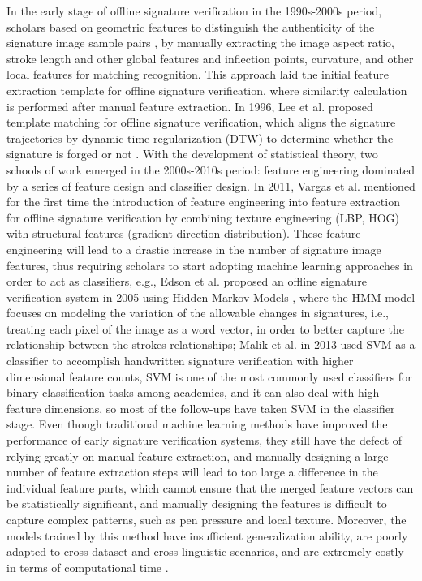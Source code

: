 In the early stage of offline signature verification in the 1990s-2000s period, scholars based on geometric features to distinguish the authenticity of the signature image sample pairs \cite{31}, by manually extracting the image aspect ratio, stroke length and other global features and inflection points, curvature, and other local features for matching recognition. This approach laid the initial feature extraction template for offline signature verification, where similarity calculation is performed after manual feature extraction. In 1996, Lee et al. proposed template matching for offline signature verification, which aligns the signature trajectories by dynamic time regularization (DTW) to determine whether the signature is forged or not \cite{20}. With the development of statistical theory, two schools of work emerged in the 2000s-2010s period: feature engineering dominated by a series of feature design and classifier design. In 2011, Vargas et al. mentioned for the first time the introduction of feature engineering into feature extraction for offline signature verification by combining texture engineering (LBP, HOG) with structural features (gradient direction distribution). These feature engineering will lead to a drastic increase in the number of signature image features, thus requiring scholars to start adopting machine learning approaches in order to act as classifiers, e.g., Edson et al. proposed an offline signature verification system in 2005 using Hidden Markov Models \cite{17}, where the HMM model focuses on modeling the variation of the allowable changes in signatures, i.e., treating each pixel of the image as a word vector, in order to better capture the relationship between the strokes relationships; Malik et al. in 2013 used SVM as a classifier to accomplish handwritten signature verification with higher dimensional feature counts, SVM is one of the most commonly used classifiers for binary classification tasks among academics, and it can also deal with high feature dimensions, so most of the follow-ups have taken SVM in the classifier stage. Even though traditional machine learning methods have improved the performance of early signature verification systems, they still have the defect of relying greatly on manual feature extraction, and manually designing a large number of feature extraction steps will lead to too large a difference in the individual feature parts, which cannot ensure that the merged feature vectors can be statistically significant, and manually designing the features is difficult to capture complex patterns, such as pen pressure and local texture. Moreover, the models trained by this method have insufficient generalization ability, are poorly adapted to cross-dataset and cross-linguistic scenarios, and are extremely costly in terms of computational time \cite{28}.


